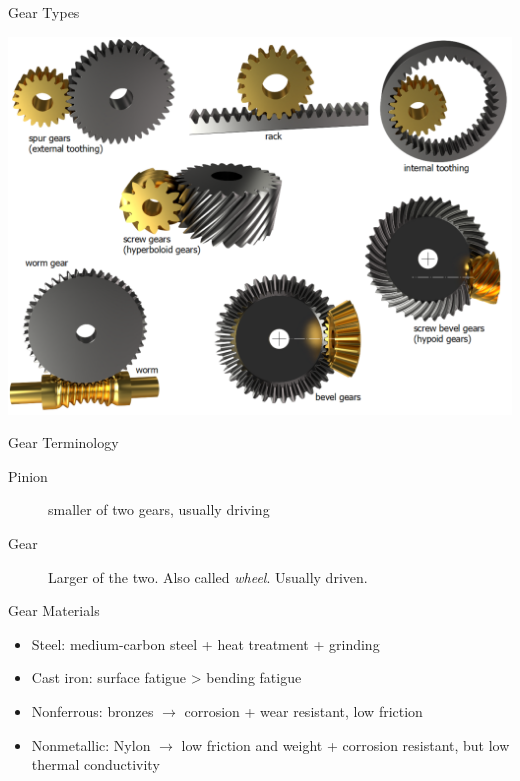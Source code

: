 \documentclass[10pt, svgnames]{beamer}
\begin{document}
\begin{frame}[label={sec:org4411e5e}]{Gear Types}
\begin{center}
\includegraphics[width=.9\linewidth]{pictures/gear-types.png}
\end{center}
\end{frame}

\begin{frame}[label={sec:org2a29b7f}]{Gear Terminology}
\begin{description}
\item[{Pinion}] smaller of two gears, usually driving

\item[{Gear}] Larger of the two. Also called \emph{wheel}. Usually driven.
\end{description}
\end{frame}

\begin{frame}[label={sec:orgd680ec6}]{Gear Materials}
\begin{itemize}
\item Steel: medium-carbon steel + heat treatment + grinding

\item Cast iron: surface fatigue > bending fatigue

\item Nonferrous: bronzes \(\rightarrow\) corrosion + wear resistant, low
friction

\item Nonmetallic: Nylon \(\rightarrow\) low friction and weight + corrosion
resistant, but low thermal conductivity
\end{itemize}
\end{frame}
\end{document}
